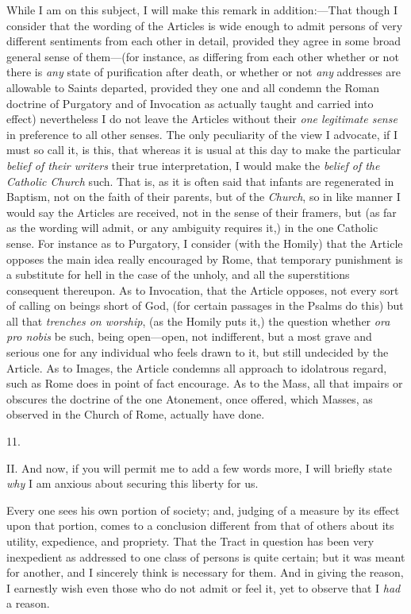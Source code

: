 While I am on this subject, I will make this
remark in addition:—That though I consider that the wording of the
Articles is wide enough to admit persons of very different sentiments
from each other in detail, provided they agree in some broad general
sense of them—(for instance, as differing from each other whether or
not there is \emph{any} state of purification after death, or whether
or not \emph{any} addresses are allowable to Saints departed, provided
they one and all condemn the Roman doctrine of Purgatory and of
Invocation as actually taught and carried into effect) nevertheless I
do not leave the Articles without their \emph{one legitimate sense} in
preference to all other senses. The only peculiarity of the view I
advocate, if I must so call it, is this, that whereas it is usual at
this day to make the particular \emph{belief of their writers} their
true interpretation, I would make the \emph{belief of the Catholic Church}
such. That is, as it is often said that infants are regenerated in
Baptism, not on the faith of their parents, but of the \emph{Church},
so in like manner I would say the Articles are received, not in the
sense of their framers, but (as far as the wording will admit, or any
ambiguity requires it,) in the one Catholic sense. For instance as to
Purgatory, I consider (with the Homily) that the Article opposes the
main idea really encouraged by Rome, that temporary punishment is a
substitute for hell in the case of the unholy, and all the
superstitions consequent thereupon. As to Invocation, that the Article
opposes, not every sort of calling on beings short of God, (for
certain passages in the Psalms do this) but all that \emph{trenches on
worship}, (as the Homily puts it,) the question whether \emph{ora pro
nobis} be such, being open—open, not indifferent, but a most
grave and serious one for any individual who feels drawn to it, but
still undecided by the Article. As to Images, the Article condemns all
approach to idolatrous regard, such as Rome does in point of fact
encourage. As to the Mass, all that impairs or obscures the doctrine
of the one Atonement, once offered, which Masses, as observed in the
Church of Rome, actually have done.

11.

II. And now, if you will permit me to add
a few words more, I will briefly state \emph{why} I am anxious about
securing this liberty for us.

Every one sees his own portion of society; and,
judging of a measure by its effect upon that portion, comes to a
conclusion different from that of others about its utility,
expedience, and propriety. That the Tract in question has been very
inexpedient as addressed to one class of persons is quite certain; but
it was meant for another, and I sincerely think is necessary for them.
And in giving the reason, I earnestly wish even those who do not admit
or feel it, yet to observe that I \emph{had} a reason.

